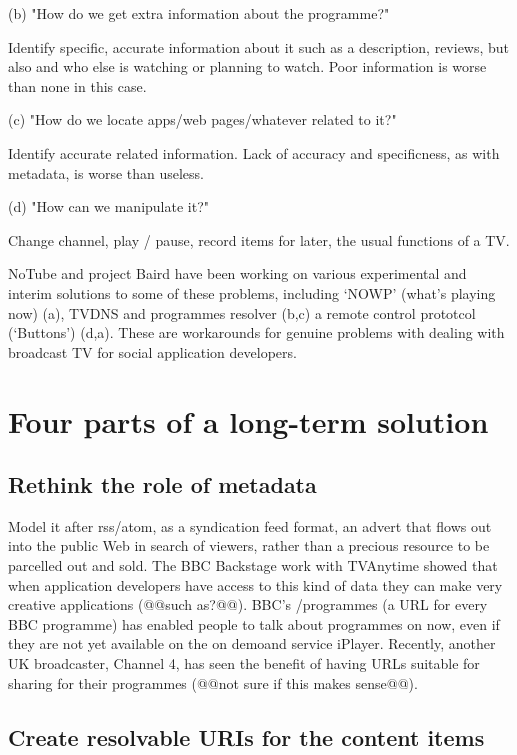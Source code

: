 \documentclass[]{article}%
\begin{document}
(b) "How do we get extra information about the programme?" 

Identify specific, accurate information about it such as a description, reviews,  but also and who else is watching or planning to watch. Poor information is worse than none in this case.

(c) "How do we locate apps/web pages/whatever related to it?" 

Identify accurate related information. Lack of accuracy and specificness, as with metadata, is worse than useless.

(d) "How can we manipulate it?"

Change channel, play / pause, record items for later, the usual functions of a TV.

NoTube and project Baird have been working on various experimental and interim solutions to some of these problems, including  `NOWP' (what's playing now) (a),  TVDNS and programmes resolver (b,c)  a remote control prototcol (`Buttons') (d,a). These are workarounds for genuine problems with dealing with broadcast TV for social application developers. 

\section{Four parts of a long-term solution}

\subsection{Rethink the role of metadata}

Model it after rss/atom, as a syndication feed format, an advert that flows out into the public Web in search of viewers, rather than a precious resource to be parcelled out and sold. The BBC Backstage work with TVAnytime showed that when application developers have access to this kind of data they can make very creative applications (@@such as?@@). BBC's /programmes (a URL for every BBC programme) has enabled people to talk about programmes on now, even if they are not yet available on the on demoand service iPlayer. Recently, another UK broadcaster, Channel 4, has seen the benefit of having URLs suitable for sharing  for their programmes (@@not sure if this makes sense@@).

\subsection{Create resolvable URIs for the content items}
\end{document}
